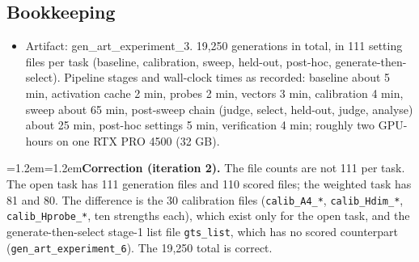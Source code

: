 \documentclass[11pt,letterpaper]{article}
\newenvironment{correction}{\par\medskip\noindent\begin{minipage}{\linewidth}\small\leftskip=1.2em\rightskip=1.2em\noindent}{\end{minipage}\par\medskip}
\begin{document}
\subsection{Bookkeeping}
\begin{itemize}
\item Artifact: gen\_art\_experiment\_3. 19,250 generations in total, in 111 setting files per task (baseline, calibration, sweep, held-out, post-hoc, generate-then-select). Pipeline stages and wall-clock times as recorded: baseline about 5 min, activation cache 2 min, probes 2 min, vectors 3 min, calibration 4 min, sweep about 65 min, post-sweep chain (judge, select, held-out, judge, analyse) about 25 min, post-hoc settings 5 min, verification 4 min; roughly two GPU-hours on one RTX PRO 4500 (32 GB).
\end{itemize}
\begin{correction}\textbf{Correction (iteration 2).} The file counts are not 111 per task. The open task has 111 generation files and 110 scored files; the weighted task has 81 and 80. The difference is the 30 calibration files (\texttt{calib\_\allowbreak{}A4\_\allowbreak{}*}, \texttt{calib\_\allowbreak{}Hdim\_\allowbreak{}*}, \texttt{calib\_\allowbreak{}Hprobe\_\allowbreak{}*}, ten strengths each), which exist only for the open task, and the generate-then-select stage-1 list file \texttt{gts\_\allowbreak{}list}, which has no scored counterpart (\texttt{gen\_\allowbreak{}art\_\allowbreak{}experiment\_\allowbreak{}6}). The 19,250 total is correct.\end{correction}
\end{document}
